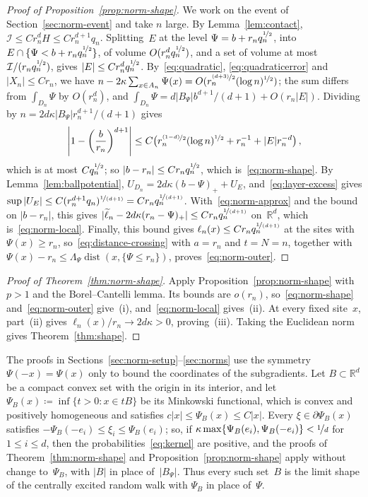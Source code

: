 \documentclass[11pt]{amsart}
\theoremstyle{plain}
\theoremstyle{definition}
\newcommand{\R}{\mathbb R}
\newcommand{\drift}{\kappa}
\newcommand{\gauge}{\Psi}
\newcommand{\nf}{\nicefrac}
\numberwithin{equation}{section}
\begin{document}
\begin{proof}[Proof of Proposition~\ref{prop:norm-shape}]
We work on the event of Section~\ref{sec:norm-event} and take $n$ large. By Lemma~\ref{lem:contact}, $\mathcal I\leq Cr_n^dH\leq Cr_n^{d+1}q_n$. Splitting~$E$ at the level $\gauge=b+r_nq_n^{\nf12}$, into $E\cap\{\gauge<b+r_nq_n^{\nf12}\}$, of volume $O(r_n^dq_n^{\nf12})$, and a set of volume at most~$\mathcal I/(r_nq_n^{\nf12})$, gives $|E|\leq Cr_n^dq_n^{\nf12}$. By~\eqref{eq:quadratic}, \eqref{eq:quadraticerror} and $|X_n|\leq Cr_n$, we have $n-2\drift\sum_{x\in A_n}\gauge(x)=O(r_n^{\nf{(d+3)}{2}}(\log n)^{\nf12})$; the sum differs from $\int_{D_n}\gauge$ by $O(r_n^d)$, and $\int_{D_n}\gauge=d|B_\gauge|b^{d+1}/(d+1)+O(r_n|E|)$. Dividing by $n=2d\drift|B_\gauge|r_n^{d+1}/(d+1)$ gives
\begin{equation}\label{eq:radius-volume}
\left|1-\left(\frac b{r_n}\right)^{d+1}\right|
\leq C\bigl(r_n^{\nf{(1-d)}{2}}(\log n)^{\nf12}+r_n^{-1}+|E|r_n^{-d}\bigr)\, ,
\end{equation}
which is at most $Cq_n^{\nf12}$; so $|b-r_n|\leq Cr_nq_n^{\nf12}$, which is~\eqref{eq:norm-shape}. By Lemma~\ref{lem:ballpotential}, $U_{D_n}=2d\drift(b-\gauge)_++U_E$, and~\eqref{eq:layer-excess} gives $\sup|U_E|\leq C(r_n^{d+1}q_n)^{\nf{1}{(d+1)}}=Cr_nq_n^{\nf{1}{(d+1)}}$. With~\eqref{eq:norm-approx} and the bound on $|b-r_n|$, this gives $|\widetilde\ell_n-2d\drift(r_n-\gauge)_+|\leq Cr_nq_n^{\nf{1}{(d+1)}}$ on~$\R^d$, which is~\eqref{eq:norm-local}. Finally, this bound gives $\ell_n(x)\leq Cr_nq_n^{\nf{1}{(d+1)}}$ at the sites with $\gauge(x)\geq r_n$, so~\eqref{eq:distance-crossing} with $a=r_n$ and $t=N=n$, together with $\gauge(x)-r_n\leq\Lambda_\gauge\operatorname{dist}(x,\{\gauge\leq r_n\})$, proves~\eqref{eq:norm-outer}.
\end{proof}

\begin{proof}[Proof of Theorem~\ref{thm:norm-shape}]
Apply Proposition~\ref{prop:norm-shape} with $p>1$ and the Borel--Cantelli lemma. Its bounds are $o(r_n)$, so~\eqref{eq:norm-shape} and~\eqref{eq:norm-outer} give~(i), and~\eqref{eq:norm-local} gives~(ii). At every fixed site~$x$, part~(ii) gives $\ell_n(x)/r_n\to2d\drift>0$, proving~(iii). Taking the Euclidean norm gives Theorem~\ref{thm:shape}.
\end{proof}

The proofs in Sections~\ref{sec:norm-setup}--\ref{sec:norms} use the symmetry $\gauge(-x)=\gauge(x)$ only to bound the coordinates of the subgradients. Let $B\subset\R^d$ be a compact convex set with the origin in its interior, and let $\gauge_B(x)\coloneqq\inf\{t>0:x\in tB\}$ be its Minkowski functional, which is convex and positively homogeneous and satisfies $c|x|\leq\gauge_B(x)\leq C|x|$. Every $\xi\in\partial\gauge_B(x)$ satisfies $-\gauge_B(-e_i)\leq\xi_i\leq\gauge_B(e_i)$; so, if $\drift\max\{\gauge_B(e_i),\gauge_B(-e_i)\}<\nf1d$ for $1\leq i\leq d$, then the probabilities~\eqref{eq:kernel} are positive, and the proofs of Theorem~\ref{thm:norm-shape} and Proposition~\ref{prop:norm-shape} apply without change to~$\gauge_B$, with $|B|$ in place of~$|B_\gauge|$. Thus every such set~$B$ is the limit shape of the centrally excited random walk with $\gauge_B$ in place of~$\gauge$.
\end{document}

